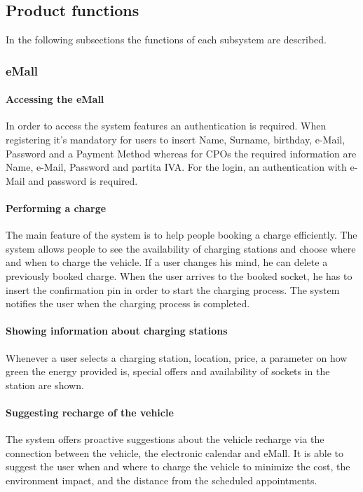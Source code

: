 \subsection{Product functions}
In the following subsections the functions of each subsystem are described.

\subsubsection{\ac{eMall}}
\paragraph{Accessing the \ac{eMall}}
In order to access the system features an authentication is required. When registering it's mandatory for users to insert Name, Surname, birthday, e-Mail, Password and a Payment Method whereas for \acp{CPO} the required information are Name, e-Mail, Password and \gls{partita IVA}. For the login, an authentication with e-Mail and password is required.

\paragraph{Performing a charge}
The main feature of the system is to help people booking a charge efficiently. The system allows people to see the availability of charging stations and choose where and when to charge the vehicle.
If a user changes his mind, he can delete a previously booked charge.
When the user arrives to the booked socket, he has to insert the confirmation pin in order to start the charging process.
The system notifies the user when the charging process is completed.

\paragraph{Showing information about charging stations}
Whenever a user selects a charging station, location, price, a parameter on how green the energy provided is, special offers and availability of sockets in the station are shown.

\paragraph{Suggesting recharge of the vehicle}
The system offers proactive suggestions about the vehicle recharge via the connection between the vehicle, the electronic calendar and \ac{eMall}. It is able to suggest the user when and where to charge the vehicle to minimize the cost, the environment impact, and the distance from the scheduled appointments.

